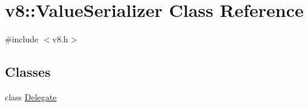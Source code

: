 \hypertarget{classv8_1_1ValueSerializer}{}\section{v8\+:\+:Value\+Serializer Class Reference}
\label{classv8_1_1ValueSerializer}


{\ttfamily \#include $<$v8.\+h$>$}

\subsection*{Classes}
\begin{DoxyCompactItemize}
\item 
class \mbox{\hyperlink{classv8_1_1ValueSerializer_1_1Delegate}{Delegate}}
\end{DoxyCompactItemize}
